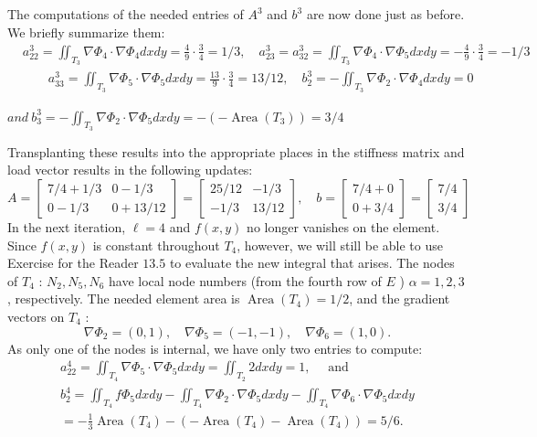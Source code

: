 \documentclass[../main.tex]{subfiles}
\begin{document}
The computations of the needed entries of $A^{3}$ and $b^{3}$ are now done just as before. We briefly summarize them:
$$
\begin{aligned}
&a_{22}^{3}=\iint_{T_{3}} \nabla \Phi_{4} \cdot \nabla \Phi_{4} d x d y=\frac{4}{9} \cdot \frac{3}{4}=1 / 3, \quad a_{23}^{3}=a_{32}^{3}=\iint_{T_{3}} \nabla \Phi_{4} \cdot \nabla \Phi_{5} d x d y=-\frac{4}{9} \cdot \frac{3}{4}=-1 / 3 \\
&\qquad a_{33}^{3}=\iint_{T_{3}} \nabla \Phi_{5} \cdot \nabla \Phi_{5} d x d y=\frac{13}{9} \cdot \frac{3}{4}=13 / 12, \quad b_{2}^{3}=-\iint_{T_{3}} \nabla \Phi_{2} \cdot \nabla \Phi_{4} d x d y=0
\end{aligned}
$$
\begin{flushleft}
$and ~b_{3}^{3}=-\iint_{T_{3}} \nabla \Phi_{2} \cdot \nabla \Phi_{5} d x d y=-\left(-\operatorname{Area}\left(T_{3}\right)\right)=3 / 4$
\end{flushleft}
Transplanting these results into the appropriate places in the stiffness matrix and load vector results in the following updates:
$$
A=\left[\begin{array}{cc}
7 / 4+1 / 3 & 0-1 / 3 \\
0-1 / 3 & 0+13 / 12
\end{array}\right]=\left[\begin{array}{cc}
25 / 12 & -1 / 3 \\
-1 / 3 & 13 / 12
\end{array}\right], \quad b=\left[\begin{array}{l}
7 / 4+0 \\
0+3 / 4
\end{array}\right]=\left[\begin{array}{l}
7 / 4 \\
3 / 4
\end{array}\right]
$$
In the next iteration, $\ell=4$ and $f(x, y)$ no longer vanishes on the element. Since $f(x, y)$ is constant throughout $T_{4}$, however, we will still be able to use Exercise for the Reader $13.5$ to evaluate the new integral that arises. The nodes of $T_{4}$ : $N_{2}, N_{5}, N_{6}$ have local node numbers (from the fourth row of $E$ ) $\alpha=1,2,3$, respectively. The needed element area is $\operatorname{Area}\left(T_{4}\right)=1 / 2$, and the gradient vectors on $T_{4}$ :
$$
\nabla \Phi_{2}=(0,1), \quad \nabla \Phi_{\mathrm{5}}=(-1,-1), \quad \nabla \Phi_{\mathrm{6}}=(1,0) .
$$
As only one of the nodes is internal, we have only two entries to compute:
$$
\begin{gathered}
a_{22}^{4}=\iint_{T_{4}} \nabla \Phi_{5} \cdot \nabla \Phi_{5} d x d y=\iint_{T_{2}} 2 d x d y=1, \quad \text { and } \\
b_{2}^{4}=\iint_{T_{4}} f \Phi_{5} d x d y-\iint_{T_{4}} \nabla \Phi_{2} \cdot \nabla \Phi_{5} d x d y-\iint_{T_{4}} \nabla \Phi_{6} \cdot \nabla \Phi_{5} d x d y \\
=-\frac{1}{3} \operatorname{Area}\left(T_{4}\right)-\left(-\operatorname{Area}\left(T_{4}\right)-\operatorname{Area}\left(T_{4}\right)\right)=5 / 6 .
\end{gathered}
$$
\end{document}
